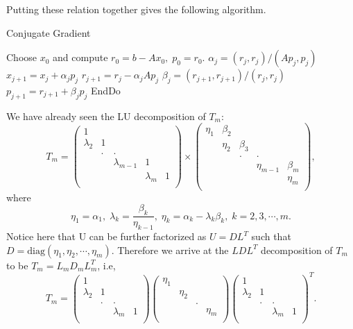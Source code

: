 \documentclass[10pt,a4paper]{article}
\begin{document}
Putting these relation together gives the following algorithm.

\begin{algorithm}
\caption{Conjugate Gradient}
\begin{algorithmic}[1]
\State Choose $x_0$ and compute $r_0=b-Ax_0,\;p_0=r_0.$
	\State $\alpha_j=(r_j,r_j)/(Ap_j,p_j)$
	\State $x_{j+1}=x_j+\alpha_jp_j$
	\State $r_{j+1}=r_j-\alpha_jAp_j$
	\State $\beta_j=(r_{j+1},r_{j+1})/(r_j,r_j)$
	\State $p_{j+1}=r_{j+1}+\beta_jp_j$
\EndFor
\State EndDo
\end{algorithmic}
\end{algorithm}

\newpage

\begin{remark}
We have already seen the LU decomposition of $T_m$:
$$
T_m = 
\left( \begin{array}{ccccc}
1 &  &  &  &  \\
\lambda_2 & 1 &  &  &  \\
 & . & . &  &  \\
 &  & \lambda_{m-1} & 1 &  \\
 &  &  & \lambda_m & 1 \\
\end{array} \right)\times 
\left( \begin{array}{ccccc}
\eta_1 & \beta_2 &  &  &  \\
 & \eta_2 & \beta_3 &  &  \\
 &  & . & . &  \\
 &  &  & \eta_{m-1} & \beta_m \\
 &  &  &  & \eta_m \\
\end{array} \right),
$$
where $$\eta_1 = \alpha_1,\;\lambda_k=\dfrac{\beta_k}{\eta_{k-1}},\;\eta_k=\alpha_k-\lambda_k\beta_k,\;k=2,3,\cdots,m.$$ 
Notice here that U can be further factorized as $U=DL^T$ such that $D=\text{diag}(\eta_1,\eta_2,\cdots,\eta_m)$. Therefore we arrive at the $LDL^T$ decomposition of $T_m$ to be $T_m=L_mD_mL^T_m$, i.e,
$$
T_m = 
\left( \begin{array}{cccc}
1 &  &  &   \\
\lambda_2 & 1 &  &  \\
 & . & . &  \\
 &  & \lambda_m & 1 \\
\end{array} \right)
\left( \begin{array}{cccc}
\eta_1 &  &  &   \\
 & \eta_2 &  &  \\
 &  & . &  \\
 &  &  & \eta_m \\
\end{array} \right)
\left( \begin{array}{cccc}
1 &  &  &   \\
\lambda_2 & 1 &  &  \\
 & . & . &  \\
 &  & \lambda_m & 1 \\
\end{array} \right)^T.
$$
\end{remark}
\end{document}

